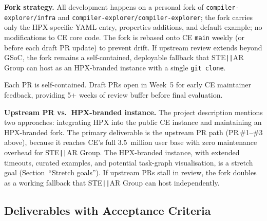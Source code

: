 \documentclass[11pt, a4paper]{article}
\newcommand{\code}[1]{\texttt{#1}}
\begin{document}
\textbf{Fork strategy.}
All development happens on a personal fork of \code{compiler-explorer/infra}
and \code{compiler-explorer/compiler-explorer}; the fork carries only the
HPX-specific YAML entry, properties additions, and default example; no
modifications to CE core code.
The fork is rebased onto CE \code{main} weekly (or before each draft PR
update) to prevent drift.
If upstream review extends beyond GSoC, the fork remains a
self-contained, deployable fallback that STE\texttt{||}AR Group can host
as an HPX-branded instance with a single \code{git clone}.

Each PR is self-contained.  Draft PRs open in Week~5 for early CE maintainer
feedback, providing 5+ weeks of review buffer before final evaluation.

\textbf{Upstream PR vs.\ HPX-branded instance.}
The project description mentions two approaches: integrating HPX into
the public CE instance and maintaining an HPX-branded fork.  The primary
deliverable is the upstream PR path (PR\,\#1--\#3 above), because it
reaches CE's full 3.5~million user base with zero maintenance overhead
for STE\texttt{||}AR Group.  The HPX-branded instance, with extended
timeouts, curated examples, and potential task-graph visualisation, is
a stretch goal (Section~``Stretch goals'').  If upstream PRs stall in
review, the fork doubles as a working fallback that STE\texttt{||}AR
Group can host independently.

\subsection*{Deliverables with Acceptance Criteria}
\end{document}
